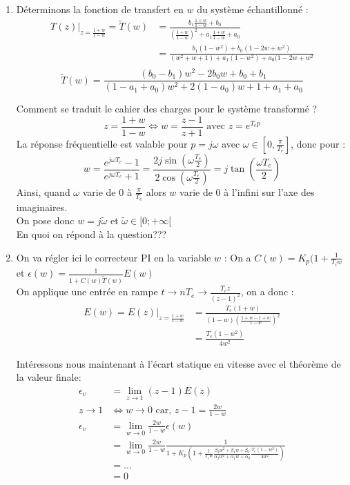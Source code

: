 \documentclass[../main.tex]{subfiles}
\begin{document}
\begin{enumerate}
\begin{enumerate}
\item Déterminons la fonction de transfert en $w$ du système échantillonné :
\begin{align*}
T(z)|_{z=\frac{1+w}{1-w}} = \tilde{T}(w) &= \frac{b_1\frac{1+w}{1-w}+b_0}{(\frac{1+w}{1-w})^2 + a_1 \frac{1+w}{1-w} + a_0}\\
&= \frac{b_1(1-w^2)+b_0(1-2w + w^2)}{(w^2+w+1)+a_1(1-w^2)+a_0(1-2w+w^2}\\
\end{align*}
\[\boxed{\tilde{T}(w)= \frac{(b_0-b_1)w^2-2b_0w + b_0+b_1}{(1-a_1+a_0)w^2 + 2(1-a_0)w + 1+a_1+a_0}}\]

\noindent Comment se traduit le cahier des charges pour le système transformé ?\\
\[ z= \frac{1+w}{1-w} \Leftrightarrow w = \frac{z-1}{z+1} \text{ avec } z= e^{T_ep} \]
La réponse fréquentielle est valable pour $p = j\omega$ avec $\omega \in [0,\frac{\pi}{T_e}]$, donc pour :
\[w = \frac{e^{j\omega T_e}-1}{e^{j\omega T_e}+1} = \frac{2j\sin(\omega \frac{T_e}{2})}{2\cos(\omega \frac{T_e}{2})} = j\tan(\frac{\omega T_e}{2})\]
Ainsi, quand $\omega$ varie de 0 à $\frac{\pi}{T_e}$ alors $w$ varie de 0 à l'infini sur l'axe des imaginaires.\\
On pose donc $w = j\tilde{\omega}$ et $\tilde{\omega}\in[0;+\infty[$ \\

En quoi on répond à la question???

\item On va régler ici le correcteur PI en la variable $w$ :
On a $C(w) = K_p(1+\frac{1}{T_iw}$ et $\epsilon(w) = \frac{1}{1+C(w)\tilde{T}(w)}E(w)$\\
On applique une entrée en rampe $t \rightarrow nT_e \rightarrow \frac{T_ez}{(z-1)^2}$, on a donc :
\begin{align*}
E(w) = E(z)|_{z=\frac{1+w}{1-w}} &= \frac{T_e(1+w)}{(1-w)(\frac{1+w-1+w}{1-w})^2}\\
&=\frac{T_e(1-{w}^2)}{4{w}^2}
\end{align*}

Intéressons nous maintenant à l'écart statique en vitesse avec el théorème de la valeur finale:
\begin{align*}
\epsilon_v &= \lim_{z \rightarrow 1} (z-1) E(z)\\
z \rightarrow 1 &\Leftrightarrow w \rightarrow 0  \text{ car, $z-1 = \frac{2w}{1-w}$}\\
\epsilon_v &= \lim_{w \rightarrow 0} \frac{2w}{1-w}\epsilon(w)\\
&= \lim_{w \rightarrow 0} \frac{2w}{1-w}\frac{1}{1+K_p(1+\frac{1}{T_iw}\frac{\beta_2{w}^2+\beta_1 w + \beta_0}{\alpha_2{w}^2+\alpha_1 w + \alpha_0}\frac{T_e(1-{w}^2)}{4{w}^2})}\\
&= ...\\
&= 0
\end{align*}


\end{enumerate}
\end{enumerate}
\end{document}
